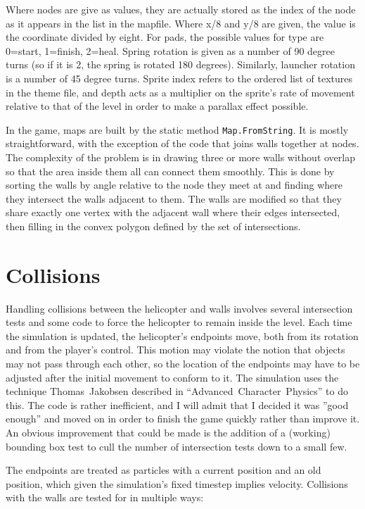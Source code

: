 \documentclass [12pt]{article}
\begin{document}
Where nodes are give as values, they are actually stored as the index of the node as it appears in the list in the mapfile. Where x/8 and y/8 are given, the value is the coordinate divided by eight. For pads, the possible values for type are 0=start, 1=finish, 2=heal. Spring rotation is given as a number of 90 degree turns (so if it is 2, the spring is rotated 180 degrees). Similarly, launcher rotation is a number of 45 degree turns. Sprite index refers to the ordered list of textures in the theme file, and depth acts as a multiplier on the sprite's rate of movement relative to that of the level in order to make a parallax effect possible.

In the game, maps are built by the static method \texttt{Map.FromString}. It is mostly straightforward, with the exception of the code that joins walls together at nodes. The complexity of the problem is in drawing three or more walls without overlap so that the area inside them all can connect them smoothly. This is done by sorting the walls by angle relative to the node they meet at and finding where they intersect the walls adjacent to them. The walls are modified so that they share exactly one vertex with the adjacent wall where their edges intersected, then filling in the convex polygon defined by the set of intersections.

\section{Collisions}

Handling collisions between the helicopter and walls involves several intersection tests and some code to force the helicopter to remain inside the level. Each time the simulation is updated, the helicopter's endpoints move, both from its rotation and from the player's control. This motion may violate the notion that objects may not pass through each other, so the location of the endpoints may have to be adjusted after the initial movement to conform to it. The simulation uses the technique \mbox{Thomas Jakobsen} described in \mbox{``Advanced Character Physics''} to do this. The code is rather inefficient, and I will admit that I decided it was ''good enough'' and moved on in order to finish the game quickly rather than improve it. An obvious improvement that could be made is the addition of a (working) bounding box test to cull the number of intersection tests down to a small few.

The endpoints are treated as particles with a current position and an old position, which given the simulation's fixed timestep implies velocity. Collisions with the walls are tested for in multiple ways:
\end{document}
